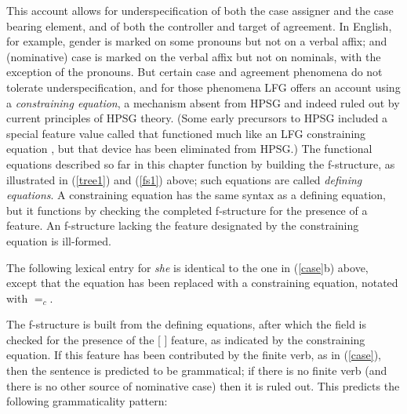 This account allows for underspecification of both the case assigner and the case bearing element, and of both the controller and target of agreement.   In  English, for example, gender is marked on some pronouns but not on a verbal affix; and (nominative) case is marked on the verbal affix but not on  nominals, with the exception of the pronouns.  But certain case and agreement phenomena do not tolerate underspecification, and for those phenomena LFG offers an account using a \textit{constraining equation}, a mechanism absent from HPSG and indeed ruled out by current principles of HPSG theory.  (Some early precursors to HPSG included a special feature value called  that functioned much like an LFG constraining equation \citep[36-7]{Shieber86a}, but that device has been eliminated from HPSG.)  The functional equations described so far in this chapter function by building the f-structure, as illustrated in (\ref{tree1}) and (\ref{fs1}) above; such equations are called \textit{defining equations}.  A constraining equation has the same syntax as a defining equation, but it functions by checking the completed f-structure for the presence of a feature.  An f-structure lacking the feature designated by the constraining equation is ill-formed.  

The following lexical entry for \textit{she} is identical to the one in (\ref{case}b) above, except that the  equation has been replaced with a constraining equation, notated with $=_c$.  

\ea
\label{constrain}
{\qquad{} }
\z
The f-structure is built from the defining equations, after which the \subj{} field is checked for the presence of the [ ] feature, as indicated by the constraining equation.  If this feature has been contributed by the finite verb, as in (\ref{case}), then the sentence is predicted to be grammatical; if there is no finite verb (and there is no other source of nominative case) then it is ruled out.  This predicts the following grammaticality pattern:

